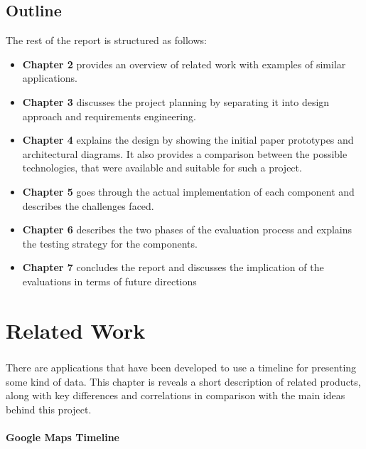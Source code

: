 \documentclass{l4proj}
\begin{document}
\section{Outline}
The rest of the report is structured as follows:
\begin{itemize}
	\item \textbf{Chapter 2} provides an overview of related work with examples of similar applications.
	
	\item \textbf{Chapter 3} discusses the project planning by separating it into design approach and requirements engineering.
	\item \textbf{Chapter 4} explains the design by showing the initial paper prototypes and architectural diagrams. It also provides a comparison between the possible technologies, that were available and suitable for such a project.
	\item \textbf{Chapter 5} goes through the actual implementation of each component and describes the challenges faced. 
	\item \textbf{Chapter 6} describes the two phases of the evaluation process and explains the testing strategy for the components.
	\item \textbf{Chapter 7} concludes the report and discusses the implication of the evaluations in terms of future directions
\end{itemize}


\chapter{Related Work}
\paragraph{}
There are applications that have been developed to use a timeline for presenting some kind of data. This chapter is reveals a short description of related products, along with key differences and correlations in comparison with the main ideas behind this project.  

\subsubsection{Google Maps Timeline} 
\end{document}
